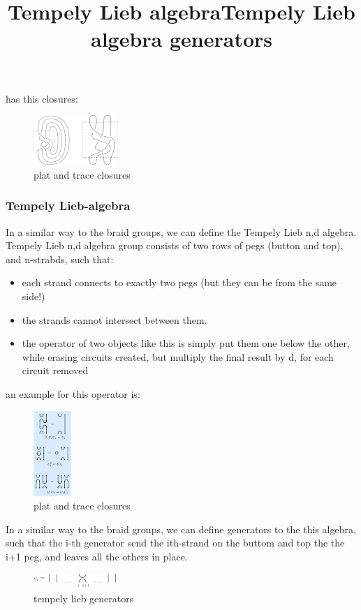 \documentclass{article}
\begin{document}
{\begin{center}
\end{center} 
has this closures:
\begin{figure}
\includegraphics[scale=0.5]{clouseres} 
\caption{plat and trace closures}
\end{figure}



\subsubsection{Tempely Lieb-algebra}
\title{Tempely Lieb algebra}
In a similar way to the braid groups, we can define the Tempely Lieb {n,d} algebra.
Tempely Lieb {n,d} algebra group consists of two rows of pegs (button and top), and n-strabds, such that:
\begin{itemize}
\item each strand connects to exactly two pegs (but they can be from the same side!)
\item the strands cannot intersect between them.
\item the operator of two objects like this is simply put them one below the other, 
while erasing circuits created, but multiply the final result by d, for each circuit removed
\end{itemize}
an example for this operator is:
\begin{figure}
\includegraphics[scale=0.5]{tempely_lieb_operator} 
\caption{plat and trace closures}
\end{figure}


\title{Tempely Lieb algebra generators}
In a similar way to the braid groups, we can define generators to the this algebra, 
such that the i-th generator send the ith-strand on the buttom and top the the i+1 peg, 
and leaves all the others in place.
\begin{figure}
\includegraphics[scale=0.5]{tempely_lieb_generators} 
\caption{tempely lieb generators}



\end{figure}}
\end{document}
